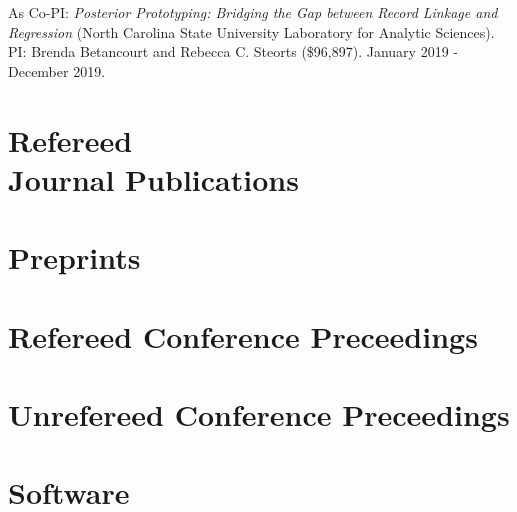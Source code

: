 \documentclass[margin,line]{res}
\begin{document}
\begin{resume}
As Co-PI: {\em Posterior Prototyping: Bridging the Gap between Record Linkage and Regression} (North Carolina State University Laboratory for Analytic Sciences). PI: Brenda Betancourt and Rebecca C. Steorts (\$96,897). January 2019 - December 2019.

\section{\sc Refereed \\ Journal Publications}
\printbibliography[keyword=refereed, heading=none, resetnumbers=true]

\section{\sc Preprints}
\printbibliography[keyword=submitted, heading=none, resetnumbers=false]

\printbibliography[keyword=inprep, heading=none]

\section{\sc Refereed Conference Preceedings}
\printbibliography[keyword=conf-ref, heading=none, resetnumbers=false]

\section{\sc Unrefereed Conference Preceedings}
\printbibliography[keyword=conf-unref, heading=none, resetnumbers=false]

\section{\sc Software}


\end{resume}
\end{document}
